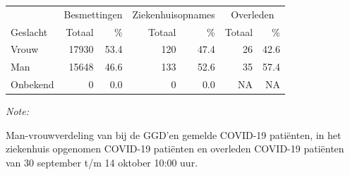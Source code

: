 \documentclass[
  english,
  man,floatsintext]{apa6}
\begin{document}
\begin{table}
\centering\begingroup\fontsize{11}{13}\selectfont

\begin{threeparttable}
\begin{tabular}{lrrrrrr}
\toprule
\multicolumn{1}{c}{ } & \multicolumn{2}{c}{Besmettingen} & \multicolumn{2}{c}{Ziekenhuisopnames} & \multicolumn{2}{c}{Overleden} \\
\cmidrule(l{3pt}r{3pt}){2-3} \cmidrule(l{3pt}r{3pt}){4-5} \cmidrule(l{3pt}r{3pt}){6-7}
Geslacht & Totaal & \% & Totaal & \% & Totaal & \%\\
\midrule
Vrouw & 17930 & 53.4 & 120 & 47.4 & 26 & 42.6\\
Man & 15648 & 46.6 & 133 & 52.6 & 35 & 57.4\\
Onbekend & 0 & 0.0 & 0 & 0.0 & NA & NA\\
\bottomrule
\end{tabular}
\begin{tablenotes}
\item \textit{Note: } 
\item Man-vrouwverdeling van bij de GGD’en gemelde COVID-19 patiënten, in het ziekenhuis opgenomen COVID-19 patiënten en overleden COVID-19 patiënten van 30 september t/m 14 oktober 10:00 uur.
\end{tablenotes}
\end{threeparttable}
\endgroup{}
\end{table}
\newpage
\end{document}
